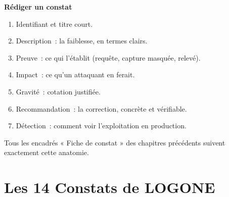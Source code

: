 \begin{boxprocedure}
\textbf{Rédiger un constat}
\begin{enumerate}
    \item Identifiant et titre court.
    \item Description~: la faiblesse, en termes clairs.
    \item Preuve~: ce qui l'établit (requête, capture masquée, relevé).
    \item Impact~: ce qu'un attaquant en ferait.
    \item Gravité~: cotation justifiée.
    \item Recommandation~: la correction, concrète et vérifiable.
    \item Détection~: comment voir l'exploitation en production.
\end{enumerate}
\end{boxprocedure}

Tous les encadrés « Fiche de constat » des chapitres précédents suivent
exactement cette anatomie.

\section{Les 14 Constats de LOGONE}
\label{sec:c22-logone}

